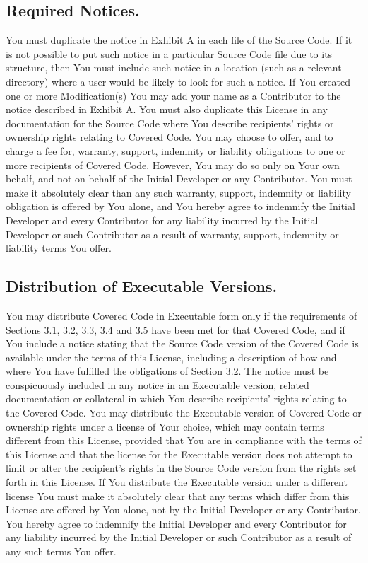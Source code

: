 \documentclass{book}
\begin{document}
\subsection{Required Notices.}
You must duplicate the notice in Exhibit A in each file of the Source Code. If it is not possible to put such notice in a particular Source Code file due to its structure, then You must include such notice in a location (such as a relevant directory) where a user would be likely to look for such a notice. If You created one or more Modification(s) You may add your name as a Contributor to the notice described in Exhibit A. You must also duplicate this License in any documentation for the Source Code where You describe recipients' rights or ownership rights relating to Covered Code. You may choose to offer, and to charge a fee for, warranty, support, indemnity or liability obligations to one or more recipients of Covered Code. However, You may do so only on Your own behalf, and not on behalf of the Initial Developer or any Contributor. You must make it absolutely clear than any such warranty, support, indemnity or liability obligation is offered by You alone, and You hereby agree to indemnify the Initial Developer and every Contributor for any liability incurred by the Initial Developer or such Contributor as a result of warranty, support, indemnity or liability terms You offer. 

\subsection{Distribution of Executable Versions.}
You may distribute Covered Code in Executable form only if the requirements of Sections 3.1, 3.2, 3.3, 3.4 and 3.5 have been met for that Covered Code, and if You include a notice stating that the Source Code version of the Covered Code is available under the terms of this License, including a description of how and where You have fulfilled the obligations of Section 3.2. The notice must be conspicuously included in any notice in an Executable version, related documentation or collateral in which You describe recipients' rights relating to the Covered Code. You may distribute the Executable version of Covered Code or ownership rights under a license of Your choice, which may contain terms different from this License, provided that You are in compliance with the terms of this License and that the license for the Executable version does not attempt to limit or alter the recipient's rights in the Source Code version from the rights set forth in this License. If You distribute the Executable version under a different license You must make it absolutely clear that any terms which differ from this License are offered by You alone, not by the Initial Developer or any Contributor. You hereby agree to indemnify the Initial Developer and every Contributor for any liability incurred by the Initial Developer or such Contributor as a result of any such terms You offer. 
\end{document}

